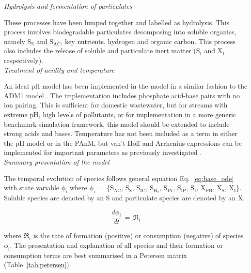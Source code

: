 \noindent\textit{Hydrolysis and fermentation of particulates}\par
\noindent These processes have been lumped together and labelled as hydrolysis. This process involves biodegradable particulates decomposing into soluble organics, namely $\mathrm{S_S}$ and $\mathrm{S_{AC}}$, key nutrients, hydrogen and organic carbon. This process also includes the release of soluble and particulate inert matter ($\mathrm{S_I}$ and $\mathrm{X_{I}}$ respectively). \\

\noindent\textit{Treatment of acidity and temperature}\par
\noindent An ideal pH model has been implemented in the model in a similar fashion to the ADM1 model \cite{batstone2002}. The implementation includes phosphate acid-base pairs with no ion pairing. This is sufficient for domestic wastewater, but for streams with extreme pH, high levels of pollutants, or for implementation in a more generic benchmark simulation framework, this model should be extended to include strong acids and bases. Temperature has not been included as a term in either the pH model or in the PAnM, but van't Hoff and Arrhenius expressions can be implemented for important parameters as previously investigated \cite{hulsen2016a}. \\

\noindent\textit{Summary presentation of the model}\par
\noindent The temporal evolution of species follows general equation Eq.~\eqref{eq:base_ode} with state variable $\mathrm{\phi_i}$ where $\mathrm{\phi_i\, = \, \{S_{AC},\, S_S,\, S_{IC},\, S_{H_2},\, S_{IN},\, S_{IP},\, S_{I},\, X_{PB},\, X_{S},\, X_{I}\}}$. Soluble species are denoted by an $\mathrm{S}$ and particulate species are denoted by an $\mathrm{X}$.

\begin{equation}
    \label{eq:base_ode}
    \frac{d\phi_i}{dt} \, = \, \mathfrak{R}_i
\end{equation}

where $\mathfrak{R}_i$ is the rate of formation (positive) or consumption (negative) of species $\mathrm{\phi_i}$. The presentation and explanation of all species and their formation or consumption terms are best summarised in a Petersen matrix (Table~\ref{tab:petersen}).

